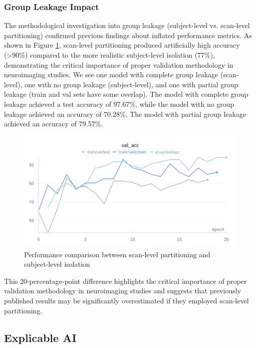 \documentclass[11pt, a4paper]{article}
\begin{document}
\subsubsection{Group Leakage Impact}

The methodological investigation into group leakage (subject-level vs. scan-level partitioning) confirmed previous findings about inflated performance metrics. As shown in Figure \ref{fig:group_leakage}, scan-level partitioning produced artificially high accuracy (>90\%) compared to the more realistic subject-level isolation (77\%), demonstrating the critical importance of proper validation methodology in neuroimaging studies. We see one model with complete group leakage (scan-level), one with no group leakage (subject-level), and one with partial group leakage (train and val sets have some overlap). The model with complete group leakage achieved a test accuracy of 97.67\%, while the model with no group leakage achieved an accuracy of 70.28\%. The model with partial group leakage achieved an accuracy of 79.57\%.

\begin{figure}[htbp]
  \centering
  \includegraphics[width=\textwidth]{figures/leakage.png}
  \caption{Performance comparison between scan-level partitioning and subject-level isolation}
  \label{fig:group_leakage}
\end{figure}

This 20-percentage-point difference highlights the critical importance of proper validation methodology in neuroimaging studies and suggests that previously published results may be significantly overestimated if they employed scan-level partitioning.

\subsection{Explicable AI}
\end{document}
